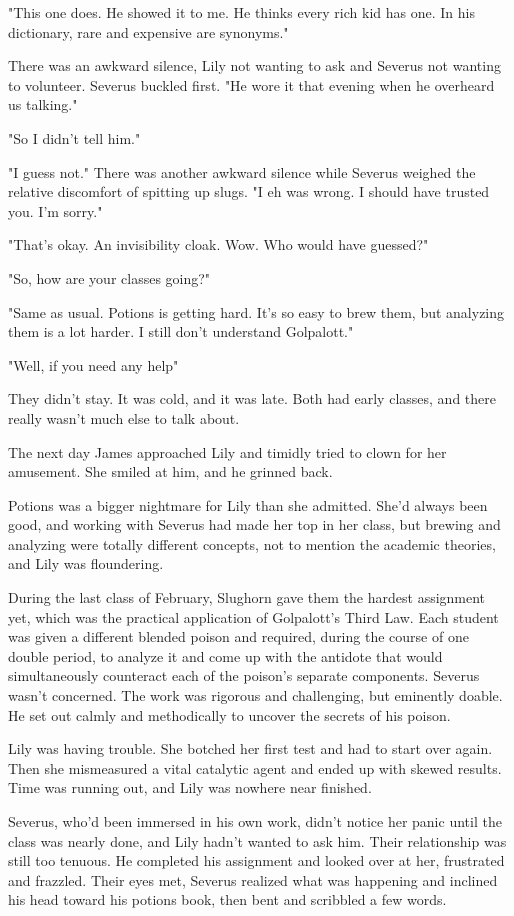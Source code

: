 "This one does. He showed it to me. He thinks every rich kid has one. In his dictionary, rare and expensive are synonyms."

There was an awkward silence, Lily not wanting to ask and Severus not wanting to volunteer. Severus buckled first. "He wore it that evening when he overheard us talking."

"So I didn't tell him."

"I guess not." There was another awkward silence while Severus weighed the relative discomfort of spitting up slugs. "I{\el} eh{\el} was wrong. I{\el} should have trusted you. I'm sorry."

"That's okay. An invisibility cloak. Wow. Who would have guessed?"

"So, how are your classes going?"

"Same as usual. Potions is getting hard. It's so easy to brew them, but analyzing them is a lot harder. I still don't understand Golpalott."

"Well, if you need any help{\el}"

They didn't stay. It was cold, and it was late. Both had early classes, and there really wasn't much else to talk about.

The next day James approached Lily and timidly tried to clown for her amusement. She smiled at him, and he grinned back.

Potions was a bigger nightmare for Lily than she admitted. She'd always been good, and working with Severus had made her top in her class, but brewing and analyzing were totally different concepts, not to mention the academic theories, and Lily was floundering.

During the last class of February, Slughorn gave them the hardest assignment yet, which was the practical application of Golpalott's Third Law. Each student was given a different blended poison and required, during the course of one double period, to analyze it and come up with the antidote that would simultaneously counteract each of the poison's separate components. Severus wasn't concerned. The work was rigorous and challenging, but eminently doable. He set out calmly and methodically to uncover the secrets of his poison.

Lily was having trouble. She botched her first test and had to start over again. Then she mismeasured a vital catalytic agent and ended up with skewed results. Time was running out, and Lily was nowhere near finished.

Severus, who'd been immersed in his own work, didn't notice her panic until the class was nearly done, and Lily hadn't wanted to ask him. Their relationship was still too tenuous. He completed his assignment and looked over at her, frustrated and frazzled. Their eyes met, Severus realized what was happening and inclined his head toward his potions book, then bent and scribbled a few words.

